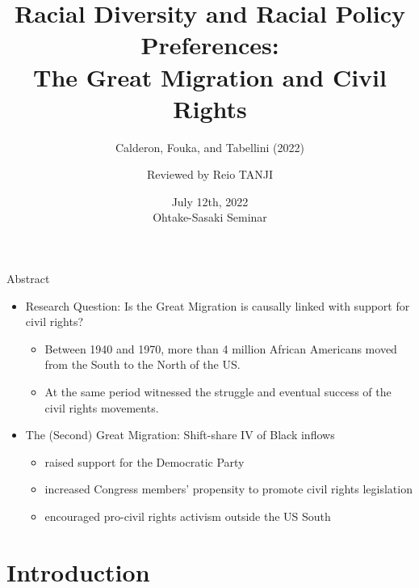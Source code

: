 \documentclass[dvipdfmx,11pt]{beamer}
\title[Calderon, Fouka, and Tabellini (2022)]{Racial Diversity and Racial Policy Preferences: \\
The Great Migration and Civil Rights}
\subtitle{Calderon, Fouka, and Tabellini (2022)}
\author{Reviewed by Reio TANJI}
\date[6/12/2022 OS Seminar]{July 12th, 2022 \\ Ohtake-Sasaki Seminar}
\institute[]{Osaka University, Graduate School of Economics}
\begin{document}
\begin{frame}\frametitle{}
\titlepage
\end{frame}

\begin{frame}{Abstract}
  \begin{itemize}
    \item Research Question: Is the Great Migration is causally linked with support for civil rights?
    \begin{itemize}
      \item Between 1940 and 1970, more than 4 million African Americans moved from the South to the North of the US.
      \item At the same period witnessed the struggle and eventual success of the civil rights movements.
    \end{itemize}
    \item The (Second) Great Migration: Shift-share IV of Black inflows
    \begin{itemize}
      \item raised support for the Democratic Party
      \item increased Congress members' propensity to promote civil rights legislation
      \item encouraged pro-civil rights activism outside the US South
    \end{itemize} 
  \end{itemize}
\end{frame}

\frame{\tableofcontents}

\section{Introduction}
\frame{\sectionpage}

\begin{frame}{}
  
\end{frame}
\end{document}
